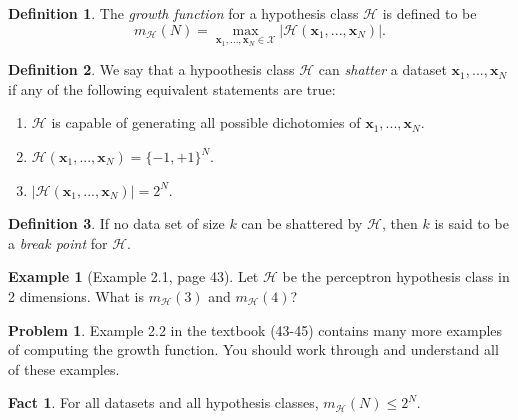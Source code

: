 \documentclass[10pt]{exam}
\theoremstyle{definition}
\newtheorem{problem}{Problem}
\newtheorem{example}{Example}
\newtheorem{defn}{Definition}
\newtheorem{fact}{Fact}
\newcommand{\x}{\mathbf x}
\newcommand{\mH}{m_{\mathcal H}}
\begin{document}
\newpage
\begin{defn}
    The \emph{growth function} for a hypothesis class $\mathcal H$ is defined to be
    \begin{equation}
        m_{\mathcal H}(N) = \max_{\x_1,...,\x_N\in\mathcal X} \big| \mathcal H(\x_1, ..., \x_N) \big|.
    \end{equation}
\end{defn}
\begin{defn}
    We say that a hypoothesis class $\mathcal H$ can \emph{shatter} a dataset $\x_1, ..., \x_N$ if any of the following equivalent statements are true:
    \begin{enumerate}
        \item $\mathcal H$ is capable of generating all possible dichotomies of $\x_1, ..., \x_N$.
        \item $\mathcal H(\x_1, ..., \x_N) = \{-1, +1\}^N$.
        \item $\left|\mathcal H(\x_1, ..., \x_N)\right| = 2^N$.
    \end{enumerate}
\end{defn}
\begin{defn}
    If no data set of size $k$ can be shattered by $\mathcal H$, then $k$ is said to be a \emph{break point} for $\mathcal H$.
\end{defn}

\begin{example}
    [Example 2.1, page 43]
    Let $\mathcal H$ be the perceptron hypothesis class in 2 dimensions.
    What is $\mH(3)$ and $\mH(4)$?
\end{example}

\vspace{6in}
\begin{problem}
    Example 2.2 in the textbook (43-45) contains many more examples of computing the growth function.
    You should work through and understand all of these examples.
\end{problem}
\begin{fact}
    For all datasets and all hypothesis classes,
        $
        \mH(N) \le 2^N.
        $
\end{fact}
\end{document}
